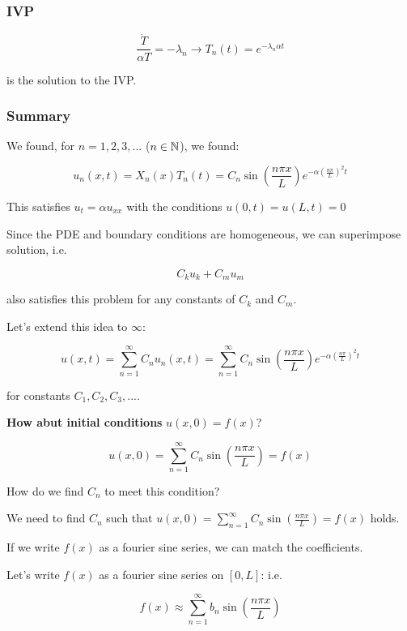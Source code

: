 \documentclass{article}
\begin{document}
\subsubsection{IVP}

$$\frac{\dot{T}}{\alpha T} = -\lambda_n \longrightarrow T_n(t) = e^{- \lambda_n \alpha t}$$

is the solution to the IVP. 

\subsubsection{Summary}

We found, for $n = 1,2,3,...$ ($n \in \mathbb{N}$), we found:

$$u_n (x,t) = X_n (x) T_n (t) = C_n \sin \left(\frac{n \pi x}{L} \right) e^{- \alpha \left( \frac{n \pi}{L} \right)^2 t}$$

This satisfies $u_t = \alpha u_{xx}$ with the conditions $u(0,t) = u(L,t) = 0$

Since the PDE and boundary conditions are homogeneous, we can superimpose solution, i.e. 

$$C_k u_k + C_m u_m$$


also satisfies this problem for any constants of $C_k$ and $C_m$. 

Let's extend this idea to $\infty$:

$$u(x,t) = \sum_{n = 1}^\infty C_n u_n(x,t) = \sum_{n = 1}^\infty C_n \sin \left( \frac{n \pi x}{L} \right) e^{- \alpha \left( \frac{n \pi}{L} \right)^2 t}$$

for constants $C_1, C_2, C_3,...$. 

\textbf{How abut initial conditions} $u(x,0) = f(x)$?

\begin{equation}
    u(x,0) = \sum_{n = 1}^\infty C_n \sin \left( \frac{n \pi x}{L} \right) = f(x)
\end{equation}

How do we find $C_n$ to meet this condition?

We need to find $C_n$ such that $u(x,0) = \sum_{n = 1}^\infty C_n \sin \left( \frac{n \pi x}{L} \right) = f(x)$ holds. 

If we write $f(x)$ as a fourier sine series, we can match the coefficients. 

Let's write $f(x)$ as a fourier sine series on $[0,L]$: i.e. 


\begin{equation}
    f(x) \approx \sum_{n = 1}^\infty b_n \sin(\frac{n \pi x}{L})
\end{equation}
\end{document}
